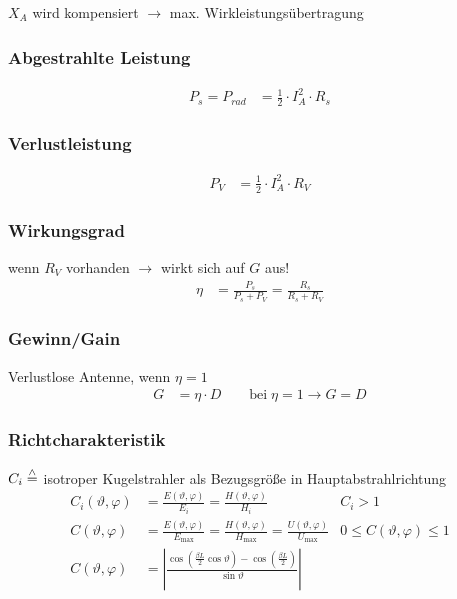 $ X_A $ wird kompensiert $ \rightarrow $ max. Wirkleistungsübertragung
\subsubsection{Abgestrahlte Leistung}
\begin{align*}
    P_s = P_{rad} & = \frac{1}{2}\cdot I_A^2 \cdot R_s
\end{align*}
\subsubsection{Verlustleistung}
\begin{align*}
    P_V & = \frac{1}{2}\cdot I_A^2\cdot R_V
\end{align*}
\subsubsection{Wirkungsgrad}
wenn $ R_V $ vorhanden $\rightarrow$ wirkt sich auf $ G $ aus!
\begin{align*}
    \eta & = \frac{P_s}{P_s + P_V} = \frac{R_s}{R_s + R_V}
\end{align*}

\subsubsection{Gewinn/Gain}
Verlustlose Antenne, wenn $ \eta = 1 $
\begin{align*}
	G & = \eta \cdot D \qquad \text{bei}\;  \eta=1 \rightarrow  G=D
\end{align*}

\subsubsection{Richtcharakteristik}
$C_{i} \stackrel{\wedge}{=}$ isotroper Kugelstrahler als Bezugsgröße in Hauptabstrahlrichtung
\begin{align*}
 	C_{i}(\vartheta, \varphi) & = \frac{E(\vartheta, \varphi)}{E_{i}}=\frac{H(\vartheta, \varphi)}{H_{i}}                                               & C_{i}>1\\
    C(\vartheta, \varphi)     & = \frac{E(\vartheta, \varphi)}{E_{\max}}=\frac{H(\vartheta, \varphi)}{H_{\max}} = \frac{U(\vartheta,\varphi)}{U_{\max}} & 0 \leq C(\vartheta, \varphi) \leq 1 \\
    C(\vartheta, \varphi) &= 
    \left|\frac{\cos\left(\frac{\beta L}{2}\cos\vartheta\right)-\cos\left(\frac{\beta L}{2}\right)}{\sin\vartheta}\right|
\end{align*}

